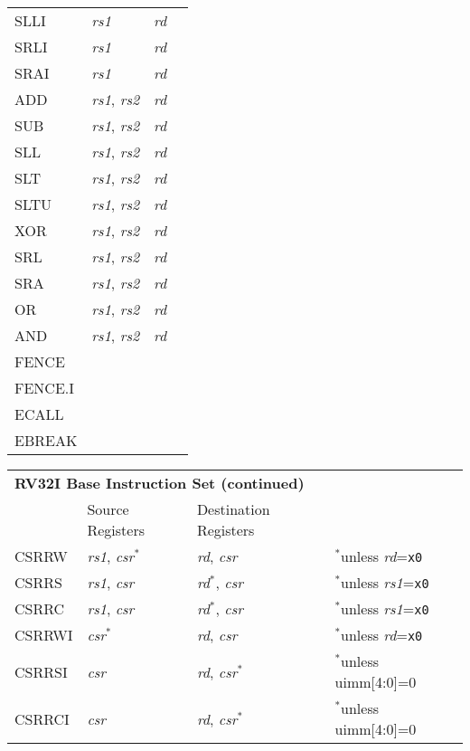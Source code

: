 \begin{tabular}{p{25mm}|p{3cm}|p{6cm}|p{4cm}}
   \cline{2-3}
   SLLI & {\em rs1} & {\em rd} &  \\
   \cline{2-3}
   SRLI & {\em rs1} & {\em rd} &  \\
   \cline{2-3}
   SRAI & {\em rs1} & {\em rd} &  \\
   \cline{2-3}
   ADD & {\em rs1}, {\em rs2} & {\em rd} &  \\
   \cline{2-3}
   SUB & {\em rs1}, {\em rs2} & {\em rd} &  \\
   \cline{2-3}
   SLL & {\em rs1}, {\em rs2} & {\em rd} &  \\
   \cline{2-3}
   SLT & {\em rs1}, {\em rs2} & {\em rd} &  \\
   \cline{2-3}
   SLTU & {\em rs1}, {\em rs2} & {\em rd} &  \\
   \cline{2-3}
   XOR & {\em rs1}, {\em rs2} & {\em rd} &  \\
   \cline{2-3}
   SRL & {\em rs1}, {\em rs2} & {\em rd} &  \\
   \cline{2-3}
   SRA & {\em rs1}, {\em rs2} & {\em rd} &  \\
   \cline{2-3}
   OR & {\em rs1}, {\em rs2} & {\em rd} &  \\
   \cline{2-3}
   AND & {\em rs1}, {\em rs2} & {\em rd} &  \\
   \cline{2-3}
   FENCE &  &  &  \\
   \cline{2-3}
   FENCE.I &  &  &  \\
   \cline{2-3}
   ECALL &  &  &  \\
   \cline{2-3}
   EBREAK &  &  &  \\
   \cline{2-3}
\end{tabular}

\begin{tabular}{p{25mm}|p{3cm}|p{6cm}|p{4cm}}
  \multicolumn{4}{l}{\bf RV32I Base Instruction Set (continued)} \\
  \cline{2-3}
   & Source Registers & Destination Registers \\
  \cline{2-3}
   CSRRW & {\em rs1}, {\em csr}$^*$ & {\em rd}, {\em csr} & $^*$unless {\em {\em rd}}={\tt x0} \\
   \cline{2-3}
   CSRRS & {\em rs1}, {\em csr} & {\em rd}$^*$, {\em csr} & $^*$unless {\em {\em rs1}}={\tt x0} \\
   \cline{2-3}
   CSRRC & {\em rs1}, {\em csr} & {\em rd}$^*$, {\em csr} & $^*$unless {\em {\em rs1}}={\tt x0} \\
   \cline{2-3}
   CSRRWI & {\em csr}$^*$ & {\em rd}, {\em csr} & $^*$unless {\em {\em rd}}={\tt x0} \\
   \cline{2-3}
   CSRRSI & {\em csr} & {\em rd}, {\em csr}$^*$ & $^*$unless uimm[4:0]=0 \\
   \cline{2-3}
   CSRRCI & {\em csr} & {\em rd}, {\em csr}$^*$ & $^*$unless uimm[4:0]=0 \\
   \cline{2-3}
\end{tabular}

